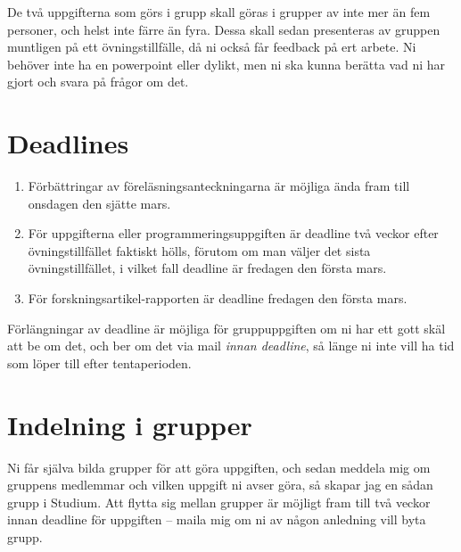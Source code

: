 \documentclass{tufte-handout}
\begin{document}
De två uppgifterna som görs i grupp skall göras i grupper av inte mer än fem personer, och helst inte färre än fyra. Dessa skall sedan presenteras av gruppen muntligen på ett övningstillfälle, då ni också får feedback på ert arbete. Ni behöver inte ha en powerpoint eller dylikt, men ni ska kunna berätta vad ni har gjort och svara på frågor om det.

\section{Deadlines}

\begin{enumerate}
	\item Förbättringar av föreläsningsanteckningarna är möjliga ända fram till onsdagen den sjätte mars.
	\item För uppgifterna eller programmeringsuppgiften är deadline två veckor efter övningstillfället faktiskt hölls, förutom om man väljer det sista övningstillfället, i vilket fall deadline är fredagen den första mars.
	\item För forskningsartikel-rapporten är deadline fredagen den första mars.
\end{enumerate}

Förlängningar av deadline är möjliga för gruppuppgiften om ni har ett gott skäl att be om det, och ber om det via mail \emph{innan deadline}, så länge ni inte vill ha tid som löper till efter tentaperioden.

\section{Indelning i grupper}

Ni får själva bilda grupper för att göra uppgiften, och sedan meddela mig om gruppens medlemmar och vilken uppgift ni avser göra, så skapar jag en sådan grupp i Studium. Att flytta sig mellan grupper är möjligt fram till två veckor innan deadline för uppgiften -- maila mig om ni av någon anledning vill byta grupp.
\end{document}
